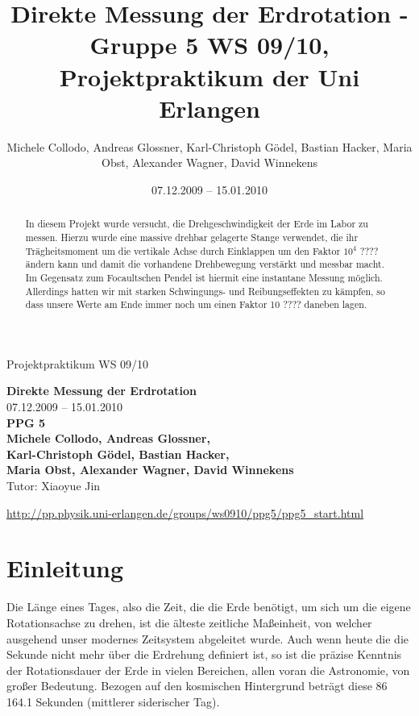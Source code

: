 \documentclass[11pt]{scrartcl}
\title{Direkte Messung der Erdrotation - Gruppe 5 WS 09/10, Projektpraktikum der Uni Erlangen}
\date{07.12.2009 -- 15.01.2010}
\author{Michele Collodo, Andreas Glossner, Karl-Christoph G\"odel, Bastian Hacker, Maria Obst, Alexander Wagner, David Winnekens}
\begin{document}
\sloppy %
\thispagestyle{empty}
\large{Projektpraktikum WS 09/10}
\hfill
{}
\\[8\baselineskip]
\begin{center}
{\fontsize{36}{54}\textbf{Direkte Messung der Erdrotation}}
\\[2\baselineskip]
{\Large 07.12.2009 -- 15.01.2010}
\\[7\baselineskip]
{\huge\textbf{PPG 5}}
\\[0.5\baselineskip]
{\large\textbf{
Michele Collodo,
Andreas Glossner,\\
Karl-Christoph G\"odel,
Bastian Hacker,\\
Maria Obst,
Alexander Wagner,
David Winnekens}\\
Tutor: Xiaoyue Jin}
\vfill



\small{\url{http://pp.physik.uni-erlangen.de/groups/ws0910/ppg5/ppg5\_start.html}}
\end{center}
\newpage



\tableofcontents
\vfill



\begin{abstract}
In diesem Projekt wurde versucht, die Drehgeschwindigkeit der Erde im Labor zu messen.
Hierzu wurde eine massive drehbar gelagerte Stange verwendet, die ihr Trägheitsmoment um die vertikale Achse durch Einklappen um den Faktor $10^4$ ???? ändern kann und damit die vorhandene Drehbewegung verstärkt und messbar macht.
Im Gegensatz zum Focaultschen Pendel ist hiermit eine instantane Messung möglich.
Allerdings hatten wir mit starken Schwingungs- und Reibungseffekten zu kämpfen, so dass unsere Werte am Ende immer noch um einen Faktor 10 ???? daneben lagen.
\end{abstract}
\newpage

\section{Einleitung} %
Die Länge eines Tages, also die Zeit, die die Erde benötigt, um sich um die eigene Rotationsachse zu drehen, ist die älteste zeitliche Maßeinheit, von welcher ausgehend unser modernes Zeitsystem abgeleitet wurde. Auch wenn heute die die Sekunde nicht mehr über die Erdrehung definiert ist, so ist die präzise Kenntnis der Rotationsdauer der Erde in vielen Bereichen, allen voran die Astronomie, von großer Bedeutung. Bezogen auf den kosmischen Hintergrund beträgt diese 86\,164.1 Sekunden (mittlerer siderischer Tag).
\end{document}
